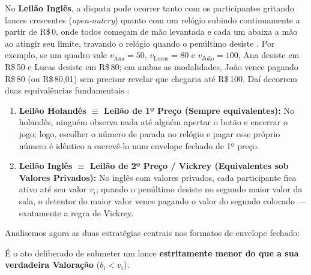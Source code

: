 No \textbf{Leilão Inglês}, a disputa pode ocorrer tanto com os participantes gritando lances crescentes (\textit{open-outcry}) quanto com um relógio subindo continuamente a partir de R\$\,0, onde todos começam de mão levantada e cada um abaixa a mão ao atingir seu limite, travando o relógio quando o penúltimo desiste \cite[p.~11]{klemperer2004}. Por exemplo, se um quadro vale $v_{\text{Ana}} = 50$, $v_{\text{Lucas}} = 80$ e $v_{\text{João}} = 100$, Ana desiste em R\$\,50 e Lucas desiste em R\$\,80; em ambas as modalidades, João vence pagando R\$\,80 (ou R\$\,80,01) sem precisar revelar que chegaria até R\$\,100. Daí decorrem duas equivalências fundamentais \cite[p.~20]{vickrey1961}:
\begin{enumerate}[label=\arabic*.]
    \item \textbf{Leilão Holandês $\equiv$ Leilão de 1º Preço (Sempre equivalentes):} No holandês, ninguém observa nada até alguém apertar o botão e encerrar o jogo; logo, escolher o número de parada no relógio e pagar esse próprio número é idêntico a escrevê-lo num envelope fechado de 1º preço.
    \item \textbf{Leilão Inglês $\equiv$ Leilão de 2º Preço / Vickrey (Equivalentes sob Valores Privados):} No inglês com valores privados, cada participante fica ativo até seu valor $v_i$; quando o penúltimo desiste no segundo maior valor da sala, o detentor do maior valor vence pagando o valor do segundo colocado --- exatamente a regra de Vickrey.
\end{enumerate}

Analisemos agora as duas estratégias centrais nos formatos de envelope fechado:

\begin{definicao}
\label{def:bid_shading}
É o ato deliberado de submeter um lance \textbf{estritamente menor do que a sua verdadeira Valoração} ($b_i < v_i$).
\end{definicao}

